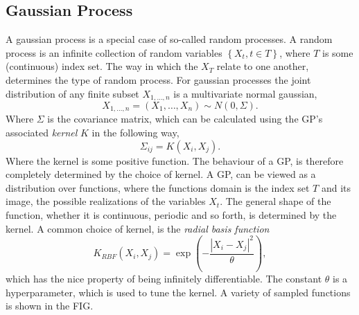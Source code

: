 \documentclass[working, oneside]{../../../Preambles/marginclass}
\begin{document}
\subsection{Gaussian Process}
A gaussian process is a special case of so-called random processes. A random process is an infinite collection of random variables $\left\{ X_t, t \in T \right\} $, where $T$ is some (continuous) index set. The way in which the $X_T$ relate to one another, determines the type of random process. For gaussian processes the joint distribution of any finite subset $X_{1, \ldots, n}$ is a multivariate normal gaussian,
\[
X_{1, \ldots, n} = \left( X_1, \ldots, X_n \right) \sim N\left( 0, \Sigma \right) 
.\] 
Where $\Sigma$ is the covariance matrix, which can be calculated using the GP's associated \textit{kernel} $K$ in the following way,
\[
\Sigma_{ij} = K\left( X_i, X_j \right) 
.\] 
Where the kernel is some positive function. The behaviour of a GP, is therefore completely determined by the choice of kernel. A GP, can be viewed as a distribution over functions, where the functions domain is the index set $T$ and its image, the possible realizations of the variables $X_t$. The general shape of the function, whether it is continuous, periodic and so forth, is determined by the kernel. A common choice of kernel, is the \textit{radial basis function}
\[
    K_{RBF}\left( X_i, X_j \right) = \exp\left(-\frac{\left| X_i - X_j \right| ^2}{\theta }\right) 
,\] 
which has the nice property of being infinitely differentiable. The constant $\theta $ is a hyperparameter, which is used to tune the kernel. A variety of sampled functions is shown in the FIG.
\end{document}
